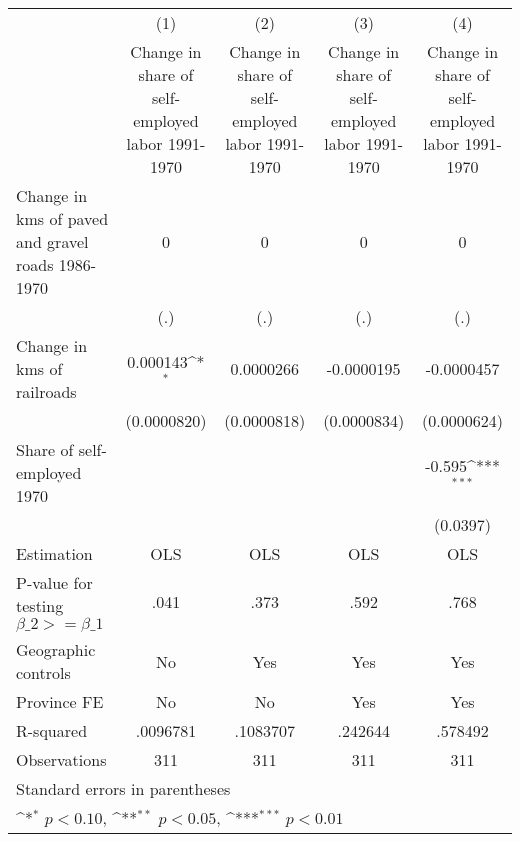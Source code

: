 {
\def\sym#1{\ifmmode^{#1}\else\(^{#1}\)\fi}
\begin{tabular}{l*{4}{c}}
\hline\hline
                    &\multicolumn{1}{c}{(1)}&\multicolumn{1}{c}{(2)}&\multicolumn{1}{c}{(3)}&\multicolumn{1}{c}{(4)}\\
                    &\multicolumn{1}{c}{Change in share of self-employed labor 1991-1970}&\multicolumn{1}{c}{Change in share of self-employed labor 1991-1970}&\multicolumn{1}{c}{Change in share of self-employed labor 1991-1970}&\multicolumn{1}{c}{Change in share of self-employed labor 1991-1970}\\
\hline
Change in kms of paved and gravel roads 1986-1970&           0         &           0         &           0         &           0         \\
                    &         (.)         &         (.)         &         (.)         &         (.)         \\
[1em]
Change in kms of railroads&    0.000143\sym{*}  &   0.0000266         &  -0.0000195         &  -0.0000457         \\
                    & (0.0000820)         & (0.0000818)         & (0.0000834)         & (0.0000624)         \\
[1em]
Share of self-employed 1970&                     &                     &                     &      -0.595\sym{***}\\
                    &                     &                     &                     &    (0.0397)         \\
\hline
Estimation          &         OLS         &         OLS         &         OLS         &         OLS         \\
P-value for testing $\beta\_2 >= \beta\_1$&        .041         &        .373         &        .592         &        .768         \\
Geographic controls &          No         &         Yes         &         Yes         &         Yes         \\
Province FE         &          No         &          No         &         Yes         &         Yes         \\
R-squared           &    .0096781         &    .1083707         &     .242644         &     .578492         \\
Observations        &         311         &         311         &         311         &         311         \\
\hline\hline
\multicolumn{5}{l}{\footnotesize Standard errors in parentheses}\\
\multicolumn{5}{l}{\footnotesize \sym{*} \(p<0.10\), \sym{**} \(p<0.05\), \sym{***} \(p<0.01\)}\\
\end{tabular}
}
